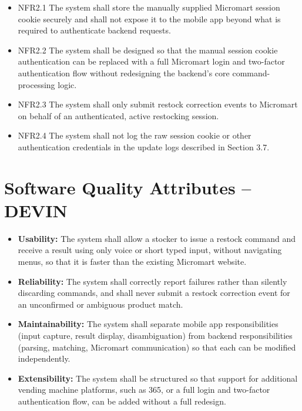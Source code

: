 \documentclass{scrreprt}
\begin{document}
\begin{itemize}
    \item NFR2.1 The system shall store the manually supplied Micromart session cookie securely and shall not expose it to the mobile app beyond what is required to authenticate backend requests.
    \item NFR2.2 The system shall be designed so that the manual session cookie authentication can be replaced with a full Micromart login and two-factor authentication flow without redesigning the backend's core command-processing logic.
    \item NFR2.3 The system shall only submit restock correction events to Micromart on behalf of an authenticated, active restocking session.
    \item NFR2.4 The system shall not log the raw session cookie or other authentication credentials in the update logs described in Section 3.7.
\end{itemize}

\section{Software Quality Attributes -- DEVIN}
\begin{itemize}
    \item \textbf{Usability:} The system shall allow a stocker to issue a restock command and receive a result using only voice or short typed input, without navigating menus, so that it is faster than the existing Micromart website.
    \item \textbf{Reliability:} The system shall correctly report failures rather than silently discarding commands, and shall never submit a restock correction event for an unconfirmed or ambiguous product match.
    \item \textbf{Maintainability:} The system shall separate mobile app responsibilities (input capture, result display, disambiguation) from backend responsibilities (parsing, matching, Micromart communication) so that each can be modified independently.
    \item \textbf{Extensibility:} The system shall be structured so that support for additional vending machine platforms, such as 365, or a full login and two-factor authentication flow, can be added without a full redesign.
\end{itemize}
\end{document}
